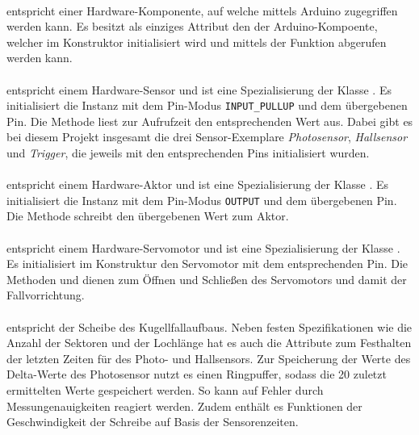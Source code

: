 \paragraph{} entspricht einer Hardware-Komponente, auf welche mittels Arduino zugegriffen werden kann.
Es besitzt als einziges Attribut den  der Arduino-Kompoente, welcher im Konstruktor initialisiert wird und mittels der Funktion  abgerufen werden kann.

\paragraph{} entspricht einem Hardware-Sensor und ist eine Spezialisierung der Klasse . 
Es initialisiert die Instanz mit dem Pin-Modus \texttt{INPUT\_PULLUP} und dem übergebenen Pin.
Die Methode  liest zur Aufrufzeit den entsprechenden Wert aus.
Dabei gibt es bei diesem Projekt insgesamt die drei Sensor-Exemplare \textit{Photosensor}, \textit{Hallsensor} und \textit{Trigger}, die jeweils mit den entsprechenden Pins initialisiert wurden. 

\paragraph{} entspricht einem Hardware-Aktor und ist eine Spezialisierung der Klasse .
Es initialisiert die Instanz mit dem Pin-Modus \texttt{OUTPUT} und dem übergebenen Pin.
Die Methode  schreibt den übergebenen Wert zum Aktor.

\paragraph{} entspricht einem Hardware-Servomotor und ist eine Spezialisierung der Klasse .
Es initialisiert im Konstruktur den Servomotor mit dem entsprechenden Pin.
Die Methoden  und  dienen zum Öffnen und Schließen des Servomotors und damit der Fallvorrichtung.

\paragraph{} entspricht der Scheibe des Kugellfallaufbaus.
Neben festen Spezifikationen wie die Anzahl der Sektoren und der Lochlänge hat es auch die Attribute zum Festhalten der letzten Zeiten für des Photo- und Hallsensors. 
Zur Speicherung der Werte des Delta-Werte des Photosensor nutzt es einen Ringpuffer, sodass die 20 zuletzt ermittelten Werte gespeichert werden.
So kann auf Fehler durch Messungenauigkeiten reagiert werden.
Zudem enthält es Funktionen der Geschwindigkeit der Schreibe auf Basis der Sensorenzeiten.

